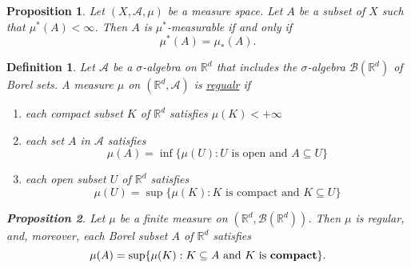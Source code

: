 \documentclass[12pt]{article}
\newtheorem{definition}{Definition}[section]
\newtheorem{proposition}{Proposition}[section]
\begin{document}
\begin{proposition}
	Let $(X, \mathcal{A}, \mu)$ be a measure space. Let $A$ be a subset of $X$ such that $\mu^*(A) < \infty$. Then $A$ is $\mu^*$-measurable if and only if
	$$\mu^*(A) = \mu_*(A).$$
\end{proposition}
\begin{definition}
	Let $\mathcal{A}$ be a $\sigma$-algebra on $\mathbb{R}^d$ that includes the $\sigma$-algebra $\mathcal{B}\left(\mathbb{R}^d\right)$ of Borel sets. A measure $\mu$ on $\left(\mathbb{R}^d, \mathcal{A}\right)$ is \underline{regualr} if
	\begin{enumerate}
		\item each compact subset $K$ of $\mathbb{R}^d$ satisfies $\mu(K)<+\infty$
		\item each set $A$ in $\mathcal{A}$ satisfies
		      $$
		      \mu(A)=\inf \{\mu(U): U \text { is open and } A \subseteq U\}$$
		\item each open subset $U$ of $\mathbb{R}^d$ satisfies
		      $$
		      \mu(U)=\sup \{\mu(K): K \text { is compact and } K \subseteq U\}
		      $$
		      
	\end{enumerate}
	
	\begin{proposition}
		Let $\mu$ be a finite measure on $\left(\mathbb{R}^d, \mathcal{B}\left(\mathbb{R}^d\right)\right)$. Then $\mu$ is regular, and, moreover, each Borel subset $A$ of $\mathbb{R}^d$ satisfies
		$$
		\mu(A)=\sup \{\mu(K): K \subseteq A \text { and } K \text { is \textbf{compact}}\} .
		$$
	\end{proposition}
	
	
\end{definition}
\end{document}
